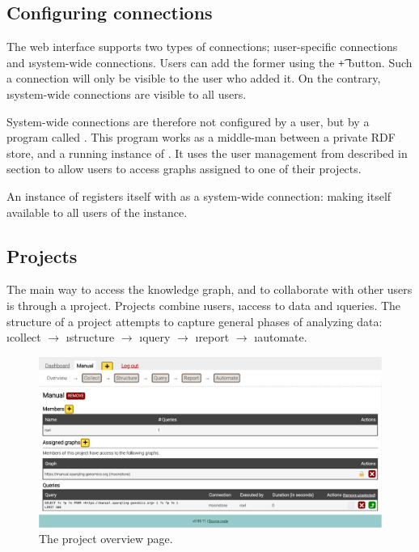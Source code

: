 \subsection{Configuring connections}
\label{sec:configure-connections}

  The web interface supports two types of connections; \i{user-specific
    connections} and \i{system-wide connections}.  Users can add the
  former using the \t{+} button.  Such a connection will only be visible
  to the user who added it.  On the contrary, \i{system-wide connections}
  are visible to all users.

  System-wide connections are therefore not configured by a user, but by a
  program called .  This program works as a middle-man
  between a private RDF store, and a running instance of .  It
  uses the user management from  described in section
   to allow users to access graphs assigned to one
  of their projects.

  An instance of  registers itself with
   as a system-wide connection: making itself available to
  all users of the  instance.

\subsection{Projects}
\label{sec:web-projects}

  The main way to access the knowledge graph, and to collaborate with other
  users is through a \i{project}.  Projects combine \i{users},
  \i{access to data} and \i{queries}.  The structure of a project
  attempts to capture general phases of analyzing data: \i{collect}
  $\rightarrow$ \i{structure} $\rightarrow$ \i{query} $\rightarrow$
  \i{report} $\rightarrow$ \i{automate}.

  \begin{figure}[H]
    \begin{center}
      \includegraphics[width=1.0\textwidth]{figures/sg-web-project-details.pdf}
    \end{center}
    \caption{The project overview page.}
    \label{fig:web-project-overview}
  \end{figure}

